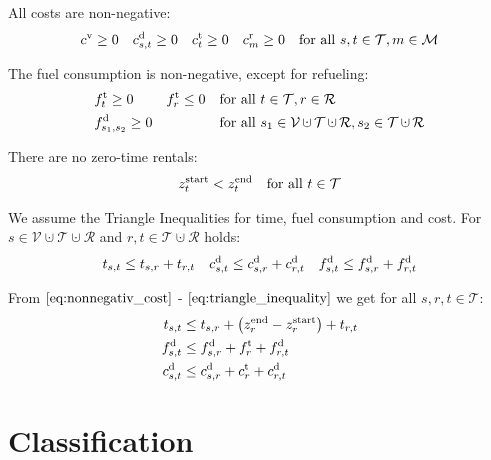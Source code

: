 All costs are non-negative:
\begin{align}
\label{eq:nonnegativ_cost}
	c^{\operatorname{v}}\geq 0 && c^{\operatorname{d}}_{s,t}\geq 0 && c^{\operatorname{t}}_t\geq 0 && c^{\operatorname{r}}_m\geq 0 && \text{for all } s,t\in\mathcal{T}, m\in\mathcal{M}
\end{align}

The fuel consumption is non-negative, except for refueling:
\begin{align}
	& \ft_t\geq 0 && \ft_r\leq 0 && \text{for all } t\in\mathcal{T}, r\in\mathcal{R} \\
	& \fd_{s_1,s_2} \geq 0 &&&& \text{for all } s_1\in\mathcal{V}\cupdot\mathcal{T}\cupdot\mathcal{R},s_2\in\mathcal{T}\cupdot\mathcal{R}
\end{align}

There are no zero-time rentals:
\begin{align}
\label{eq:notime_trip}
	z^{\operatorname{start}}_t < z^{\operatorname{end}}_t && \text{for all } t\in\mathcal{T}
\end{align}

We assume the Triangle Inequalities for time, fuel consumption and cost. For \linebreak
${s\in\mathcal{V}\cupdot\mathcal{T}\cupdot\mathcal{R}}$ and $r,t\in\mathcal{T}\cupdot\mathcal{R}$ holds:
\begin{align}
\label{eq:triangle_inequality}
	t_{s,t} \leq t_{s,r} + t_{r,t} && c^{\operatorname{d}}_{s,t} \leq c^{\operatorname{d}}_{s,r} + c^{\operatorname{d}}_{r,t} && f^{\operatorname{d}}_{s,t} \leq f^{\operatorname{d}}_{s,r} + f^{\operatorname{d}}_{r,t}
\end{align}

From $\eqref{eq:nonnegativ_cost}$ - $\eqref{eq:triangle_inequality}$ we get for all $s,r,t\in\mathcal{T}$:
\begin{align}
	t_{s,t} & \leq t_{s,r} + \left(z^{\operatorname{end}}_r - z^{\operatorname{start}}_r\right) + t_{r,t} \label{eq:triangle_inequality_time} \\
	f^{\operatorname{d}}_{s,t} & \leq f^{\operatorname{d}}_{s,r} + f^{\operatorname{t}}_{r} + f^{\operatorname{d}}_{r,t} \label{eq:triangle_inequality_fuel} \\
	c^{\operatorname{d}}_{s,t} & \leq c^{\operatorname{d}}_{s,r} + c^{\operatorname{t}}_{r} + c^{\operatorname{d}}_{r,t} \label{eq:triangle_inequality_cost}
\end{align}


\section{Classification}
\label{sec:classification}

